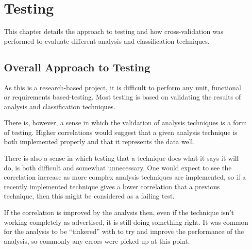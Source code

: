 \chapter{Testing}



This chapter details the approach to testing and how cross-validation was
performed to evaluate different analysis and classification techniques.

\section{Overall Approach to Testing}
As this is a research-based project, it is difficult to perform any unit, functional or 
requirements based-testing. Most testing is based on validating the results of analysis and 
classification techniques.

There is, however, a sense in which the validation of analysis techniques is a form of testing.
Higher correlations would suggest that a given analysis technique is both implemented properly and
that it represents the data well.

There is also a sense in which testing that a technique does what it says it will do, is both 
difficult and somewhat unnecessary. One would expect to see the correlation increase as more
complex analysis techniques are implemented, so if a recently implemented technique gives a lower
correlation that a previous technique, then this might be considered as a failing test.

If the correlation is improved by the analysis then, even if the technique isn't working 
completely as advertised, it is still doing something right. It was common for the analysis to be
``tinkered'' with to try and improve the performance of the analysis, so commonly any errors were
picked up at this point.

